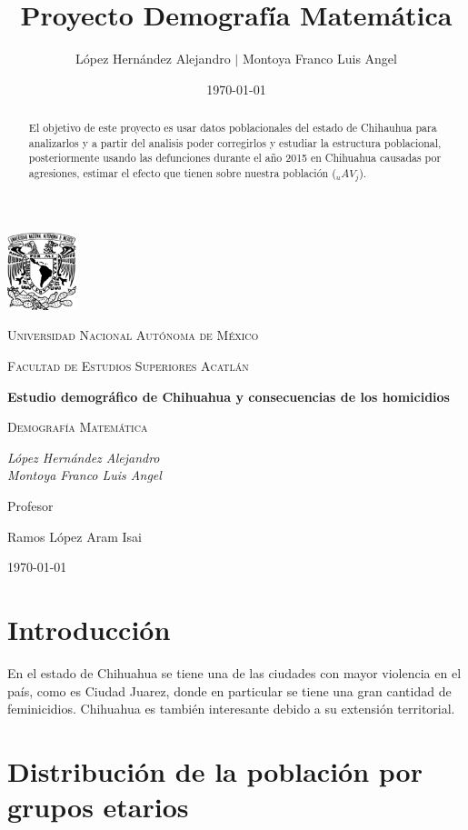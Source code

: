 \documentclass[fontsize=11pt]{article}
\title{Proyecto Demografía Matemática}
\author{  López Hernández Alejandro $|$ Montoya Franco Luis Angel} %
\date{\normalsize\today} %
\begin{document}
\begin{titlepage}
	\centering
	\includegraphics[width=0.15\textwidth]{UNAM}\par\vspace{1cm}
	{\scshape\LARGE Universidad Nacional Autónoma de México\par}
	\vspace{1cm}
	{\scshape\Large Facultad de Estudios Superiores Acatlán\par}
	\vspace{1.5cm}
	{\huge\bfseries Estudio demográfico de Chihuahua y consecuencias de los homicidios  \par}
	\vspace{2cm}
	{\scshape\Large Demografía Matemática\par}
	\vspace{2cm}
	{\Large\itshape López Hernández Alejandro \\ Montoya Franco Luis Angel\par}
	\vfill
	Profesor\par
	Ramos López Aram Isai

	\vfill

	{\large \today\par}
\end{titlepage}
\begin{abstract}
   El objetivo de este proyecto es usar datos poblacionales del estado de Chihauhua para analizarlos y a partir del analisis poder corregirlos y estudiar la estructura poblacional, posteriormente usando las defunciones durante el año 2015 en Chihuahua causadas por agresiones, estimar el efecto que tienen sobre nuestra población ($_u AV_{j}$). 
\end{abstract}

\section*{Introducción}
En el estado de Chihuahua se tiene una de las ciudades con mayor violencia en el país, como es Ciudad Juarez, donde en particular se tiene una gran cantidad de feminicidios. Chihuahua es también interesante debido a su extensión territorial. 
\\ 
\section*{Distribución de la población por grupos etarios}
\end{document}
